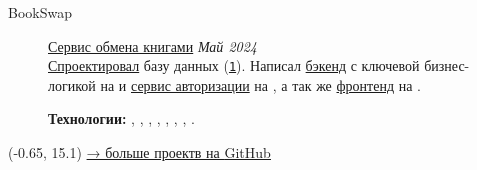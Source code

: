 \documentclass[margin,line]{resume}
\begin{document}
\begin{resume}
  \begin{description}

    \item[BookSwap]\small{\href{https://github.com/alchemmist/bookswap}{Сервис
        обмена книгами} \hfill
      \textsl{Май 2024\vspace{1mm}}}\\
      \href{https://github.com/alchemmist/bookswap/blob/dev/docs/database.md}{Спроектировал}
      базу данных
      (\href{https://github.com/alchemmist/bookswap/blob/dev/backend/src/main/resources/schema.sql}{\texttt{1}}).
      Написал
      \href{https://github.com/alchemmist/bookswap/tree/dev/backend}{бэкенд}
      с ключевой бизнес-логикой на  и
      \href{https://github.com/alchemmist/bookswap/tree/dev/auth-service}{сервис
      авторизации} на , а так же
      \href{https://github.com/alchemmist/bookswap/tree/dev/frontend}{фронтенд}
      на
      .

      \textbf{Технологии:} ,
      , , 
      , , ,
      , .

  \end{description}
\end{resume}

\begin{minipage}[H]{9.18\textwidth}
  \begin{textblock}{7}(-0.65, 15.1)
    \begingroup
    \hspace{35mm}
    \hypersetup{urlcolor=gray!90}
    \large
    \href{https://github.com/alchemmist}{→ больше проектв на \underline{GitHub}}
    \endgroup
  \end{textblock}

\end{minipage}

\clearpage
\end{document}
